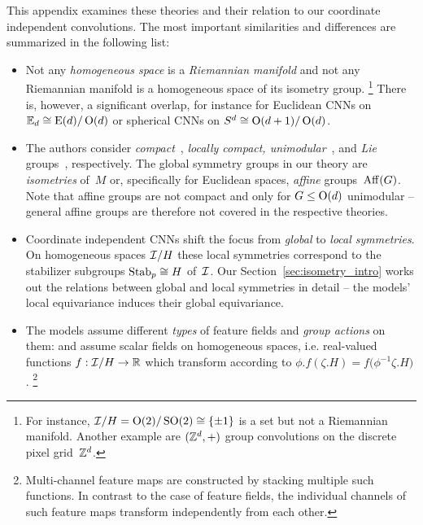 This appendix examines these theories and their relation to our coordinate independent convolutions.
The most important similarities and differences are summarized in the following list:
\begin{itemize}
    \item[{\rule[2.2pt]{2pt}{2pt}}]
        Not any \emph{homogeneous space} is a \emph{Riemannian manifold} and not any Riemannian manifold is a homogeneous space of its isometry group.%
        \footnote{
            For instance, $\mathcal{I}/H = \operatorname{O}(2)/\operatorname{SO}(2) \cong \{\pm1\}$ is a set but not a Riemannian manifold.
            Another example are $(\mathbb{Z}^d,+)$ group convolutions on the discrete pixel grid~$\mathbb{Z}^d$.
        }
        There is, however, a significant overlap, for instance for Euclidean CNNs on $\mathbb{E}_d \cong \operatorname{E}(d)/\operatorname{O}(d)$ or spherical CNNs on $S^d \cong \operatorname{O}(d+1)/\operatorname{O}(d)$.
    \item[{\rule[2.2pt]{2pt}{2pt}}]
        The authors consider \emph{compact}~\cite{Kondor2018-GENERAL}, \emph{locally compact, unimodular}~\cite{Cohen2018-intertwiners}\cite{Cohen2019-generaltheory}, and \emph{Lie} groups~\cite{bekkers2020bspline}, respectively.
        The global symmetry groups in our theory are \emph{isometries} of~$M$ or, specifically for Euclidean spaces, \emph{affine} groups~$\operatorname{Aff}(G)$.
        Note that affine groups are not compact and only for $G\leq\operatorname{O}(d)$ unimodular -- general affine groups are therefore not covered in the respective theories.
    \item[{\rule[2.2pt]{2pt}{2pt}}]
        Coordinate independent CNNs shift the focus from \emph{global} to \emph{local symmetries}.
        On homogeneous spaces $\mathcal{I}/H$ these local symmetries correspond to the stabilizer subgroups $\operatorname{Stab}_{p} \cong H$ of~$\mathcal{I}$.
        Our Section~\ref{sec:isometry_intro} works out the relations between global and local symmetries in detail --
        the models' local equivariance induces their global equivariance.
    \item[{\rule[2.2pt]{2pt}{2pt}}]
        The models assume different \emph{types} of feature fields and \emph{group actions} on them:
        \citet{Kondor2018-GENERAL} and \citet{bekkers2020bspline} assume scalar fields on homogeneous spaces, i.e. real-valued functions ${f: \mathcal{I}/H \to \mathbb{R}}$ which transform according to
        $\phi.f (\zeta.H) = f\big( \phi^{-1} \zeta.H \big)$.%
        \footnote{
            Multi-channel feature maps are constructed by stacking multiple such functions.
            In contrast to the case of feature fields, the individual channels of such feature maps transform independently from each other.
}
\end{itemize}
